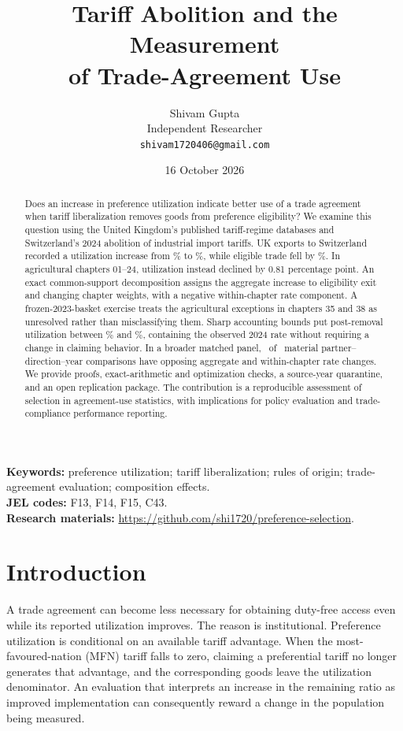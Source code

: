 \documentclass[11pt,a4paper]{article}
\title{Tariff Abolition and the Measurement\\of Trade-Agreement Use}
\author{Shivam Gupta\\\normalsize Independent Researcher\\\normalsize\texttt{shivam1720406@gmail.com}}
\date{16 October 2026}
\begin{document}
\maketitle
\begin{abstract}
Does an increase in preference utilization indicate better use of a trade agreement when tariff liberalization removes goods from preference eligibility? We examine this question using the United Kingdom's published tariff-regime databases and Switzerland's 2024 abolition of industrial import tariffs. UK exports to Switzerland recorded a utilization increase from \SwissBefore\% to \SwissAfter\%, while eligible trade fell by \EligibleFall\%. In agricultural chapters 01--24, utilization instead declined by 0.81 percentage point. An exact common-support decomposition assigns the aggregate increase to eligibility exit and changing chapter weights, with a negative within-chapter rate component. A frozen-2023-basket exercise treats the agricultural exceptions in chapters 35 and 38 as unresolved rather than misclassifying them. Sharp accounting bounds put post-removal utilization between \LowerBound\% and \UpperBound\%, containing the observed 2024 rate without requiring a change in claiming behavior. In a broader matched panel, \ReversalCount\ of \PanelCount\ material partner--direction--year comparisons have opposing aggregate and within-chapter rate changes. We provide proofs, exact-arithmetic and optimization checks, a source-year quarantine, and an open replication package. The contribution is a reproducible assessment of selection in agreement-use statistics, with implications for policy evaluation and trade-compliance performance reporting.
\end{abstract}
\noindent\textbf{Keywords:} preference utilization; tariff liberalization; rules of origin; trade-agreement evaluation; composition effects.\\
\textbf{JEL codes:} F13, F14, F15, C43.\\
\textbf{Research materials:} \url{https://github.com/shi1720/preference-selection}.

\section{Introduction}
A trade agreement can become less necessary for obtaining duty-free access even while its reported utilization improves. The reason is institutional. Preference utilization is conditional on an available tariff advantage. When the most-favoured-nation (MFN) tariff falls to zero, claiming a preferential tariff no longer generates that advantage, and the corresponding goods leave the utilization denominator. An evaluation that interprets an increase in the remaining ratio as improved implementation can consequently reward a change in the population being measured.
\end{document}
